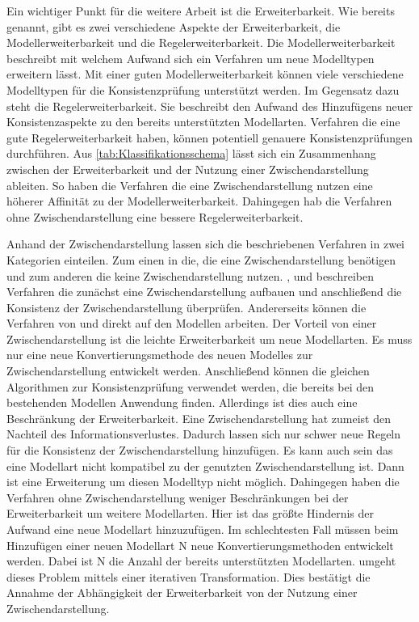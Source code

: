 Ein wichtiger Punkt für die weitere Arbeit ist die Erweiterbarkeit.
Wie bereits genannt, gibt es zwei verschiedene Aspekte der Erweiterbarkeit, die Modellerweiterbarkeit und die Regelerweiterbarkeit.
Die Modellerweiterbarkeit beschreibt mit welchem Aufwand sich ein Verfahren um neue Modelltypen erweitern lässt.
Mit einer guten Modellerweiterbarkeit können viele verschiedene Modelltypen für die Konsistenzprüfung unterstützt werden.
Im Gegensatz dazu steht die Regelerweiterbarkeit.
Sie beschreibt den Aufwand des Hinzufügens neuer Konsistenzaspekte zu den bereits unterstützten Modellarten.
Verfahren die eine gute Regelerweiterbarkeit haben, können potentiell genauere Konsistenzprüfungen durchführen.
Aus \cref{tab:Klassifikationsschema} lässt sich ein Zusammenhang zwischen der Erweiterbarkeit und der Nutzung einer Zwischendarstellung ableiten.
So haben die Verfahren die eine Zwischendarstellung nutzen eine höherer Affinität zu der Modellerweiterbarkeit.
Dahingegen hab die Verfahren ohne Zwischendarstellung eine bessere Regelerweiterbarkeit.

Anhand der Zwischendarstellung lassen sich die beschriebenen Verfahren in zwei Kategorien einteilen.
Zum einen in die, die eine Zwischendarstellung benötigen und zum anderen die keine Zwischendarstellung nutzen.
\cite{Rasch2003}, \cite{Shinkawa2006} und \cite{Mens2005} beschreiben Verfahren die zunächst eine Zwischendarstellung aufbauen und anschließend die Konsistenz der Zwischendarstellung überprüfen.
Andererseits können die Verfahren von \cite{Egyed2001} und \cite{Egyed2006} direkt auf den Modellen arbeiten.
Der Vorteil von einer Zwischendarstellung ist die leichte Erweiterbarkeit um neue Modellarten.
Es muss nur eine neue Konvertierungsmethode des neuen Modelles zur Zwischendarstellung entwickelt werden.
Anschließend können die gleichen Algorithmen zur Konsistenzprüfung verwendet werden, die bereits bei den bestehenden Modellen Anwendung finden.
Allerdings ist dies auch eine Beschränkung der Erweiterbarkeit.
Eine Zwischendarstellung hat zumeist den Nachteil des Informationsverlustes.
Dadurch lassen sich nur schwer neue Regeln für die Konsistenz der Zwischendarstellung hinzufügen.
Es kann auch sein das eine Modellart nicht kompatibel zu der genutzten Zwischendarstellung ist.
Dann ist eine Erweiterung um diesen Modelltyp nicht möglich.
Dahingegen haben die Verfahren ohne Zwischendarstellung weniger Beschränkungen bei der Erweiterbarkeit um weitere Modellarten.
Hier ist das größte Hindernis der Aufwand eine neue Modellart hinzuzufügen.
Im schlechtesten Fall müssen beim Hinzufügen einer neuen Modellart N neue Konvertierungsmethoden entwickelt werden.
Dabei ist N die Anzahl der bereits unterstützten Modellarten.
\cite{Egyed2001} umgeht dieses Problem mittels einer iterativen Transformation.
Dies bestätigt die Annahme der Abhängigkeit der Erweiterbarkeit von der Nutzung einer Zwischendarstellung.

